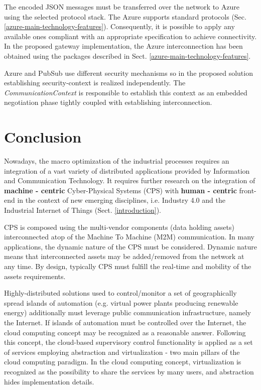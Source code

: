 \documentclass[runningheads]{llncs}
\begin{document}
The encoded JSON messages must be transferred over the network to Azure using the selected protocol stack. The Azure supports standard protocols (Sec. \ref{azure-main-technology-features}). Consequently, it is possible to apply any available ones compliant with an appropriate specification to achieve connectivity. In the proposed gateway implementation, the Azure interconnection has been obtained using the packages described in Sect. \ref{azure-main-technology-features}.

Azure and PubSub use different security mechanisms so in the proposed solution establishing security-context is realized independently. The \emph{CommunicationContext} is responsible to establish this context as an embedded negotiation phase tightly coupled with establishing interconnection.

\section{Conclusion}\label{section.conclusion}

Nowadays, the macro optimization of the industrial processes requires an integration of a vast variety of distributed applications provided by Information and Communication Technology. It requires further research on the integration of \textbf{machine - centric} Cyber-Physical Systems (CPS) with \textbf{human - centric} front-end in the context of new emerging disciplines, i.e. Industry 4.0 and the Industrial Internet of Things (Sect. \ref{introduction}).

CPS is composed using the multi-vendor components (data holding assets) interconnected atop of the Machine To Machine (M2M) communication. In many applications, the dynamic nature of the CPS must be considered. Dynamic nature means that interconnected assets may be added/removed from the network at any time. By design, typically CPS must fulfill the real-time and mobility of the assets requirements.

Highly-distributed solutions used to control/monitor a set of geographically spread islands of automation (e.g. virtual power plants producing renewable energy) additionally must leverage public communication infrastructure, namely the Internet. If islands of automation must be controlled over the Internet, the cloud computing concept may be recognized as a reasonable answer. Following this concept, the cloud-based supervisory control functionality is applied as a set of services employing abstraction and virtualization - two main pillars of the cloud computing paradigm. In the cloud computing concept, virtualization is recognized as the possibility to share the services by many users, and abstraction hides implementation details.
\end{document}
